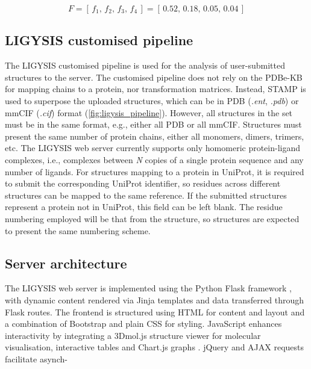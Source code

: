 \begin{equation}
F = [\,f_{1},\,f_{2},\,f_{3},\,f_{4}\,] 
    = [\,0.52,\,0.18,\,0.05,\,0.04\,]
\label{eq:func_prob_vector}
\end{equation}

\vspace{-12pt} %
\vspace{-12pt} %

\subsection{LIGYSIS customised pipeline}

The LIGYSIS customised pipeline is used for the analysis of user-submitted structures to the server. The customised pipeline does not rely on the PDBe-KB for mapping chains to a protein, nor transformation matrices. Instead, STAMP \cite{RUSSELL_1992_STAMP} is used to superpose the uploaded structures, which can be in PDB (\textit{.ent}, \textit{.pdb}) or mmCIF (\textit{.cif}) format (\autoref{fig:ligysis_pipeline}). However, all structures in the set must be in the same format, e.g., either all PDB or all mmCIF. Structures must present the same number of protein chains, either all monomers, dimers, trimers, etc. The LIGYSIS web server currently supports only homomeric protein-ligand complexes, i.e., complexes between \textit{N} copies of a single protein sequence and any number of ligands. For structures mapping to a protein in UniProt, it is required to submit the corresponding UniProt identifier, so residues across different structures can be mapped to the same reference. If the submitted structures represent a protein not in UniProt, this field can be left blank. The residue numbering employed will be that from the structure, so structures are expected to present the same numbering scheme.

\subsection{Server architecture}

The LIGYSIS web server is implemented using the Python Flask framework \cite{GRINBERG_2018_FLASK}, with dynamic content rendered via Jinja templates \cite{JINJA} and data transferred through Flask routes. The frontend is structured using HTML for content and layout and a combination of Bootstrap \cite{BOOTSTRAP} and plain CSS \cite{HTML_CSS} for styling. JavaScript \cite{JAVASCRIPT} enhances interactivity by integrating a 3Dmol.js structure viewer \cite{REGO_2014_3DMOL, SESHADRI_2020_3DMOL} for molecular visualisation, interactive tables and Chart.js graphs \cite{CHARTJS}. jQuery \cite{jQUERY} and AJAX \cite{AJAX} requests facilitate asynch-

